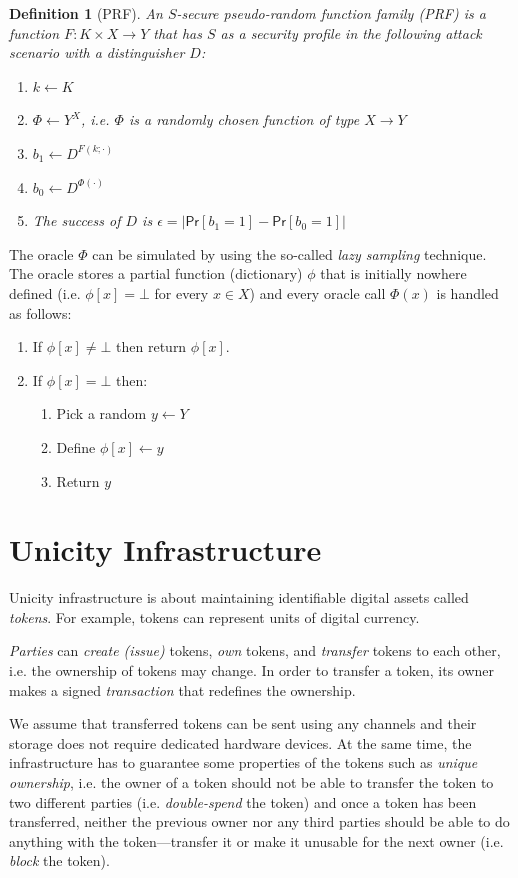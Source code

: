 \documentclass{article}
\newtheorem{definition}{Definition}[section]
\begin{document}
\begin{definition}[PRF] An $S$-secure \emph{pseudo-random function family (PRF)} is a function $F\colon K\times X \rightarrow Y$ that has $S$ as a security profile in the following attack scenario with a distinguisher $D$:
\begin{enumerate}
\item $k\gets K$
\item $\Phi\gets Y^X$, i.e. $\Phi$ is a randomly chosen function of type $X\rightarrow Y$
\item $b_1\gets D^{F(k;\cdot)}$
\item $b_0\gets D^{\Phi(\cdot)}$
\item The success of $D$ is
$\epsilon=|\mathsf{Pr}[b_1=1]-\mathsf{Pr}[b_0=1]|$
\end{enumerate}
\end{definition}
The oracle $\Phi$ can be simulated by using the so-called \emph{lazy sampling} technique. The oracle stores a partial function (dictionary) $\phi$
that is initially nowhere defined (i.e. $\phi[x]=\bot$ for every $x\in X$) and every oracle call $\Phi(x)$ is handled as follows:
\begin{enumerate}
\item If $\phi[x]\neq \bot$ then return $\phi[x]$.
\item If $\phi[x]=\bot$ then:
\begin{enumerate}
\item Pick a random $y\gets Y$
\item Define $\phi[x]\gets y$
\item Return $y$
\end{enumerate}
\end{enumerate}



\section{Unicity Infrastructure}

Unicity infrastructure is about maintaining identifiable digital assets called \emph{tokens}. For example, tokens can represent units of digital currency.

\emph{Parties} can \emph{create (issue)} tokens, \emph{own} tokens, and \emph{transfer} tokens to each other, i.e. the ownership of tokens may change. In order to transfer a token, its owner makes a signed \emph{transaction} that redefines the ownership.

We assume that transferred tokens can be sent using any channels and their storage does not require dedicated hardware devices. At the same time, the infrastructure has to guarantee some properties of the tokens such as \emph{unique ownership}, i.e. the owner of a token should not be able to transfer the token to two different parties (i.e. \emph{double-spend} the token) and once a token has been transferred, neither the previous owner nor any third parties should be able to do anything with the token---transfer it or make it unusable for the next owner (i.e. \emph{block} the token).
\end{document}
